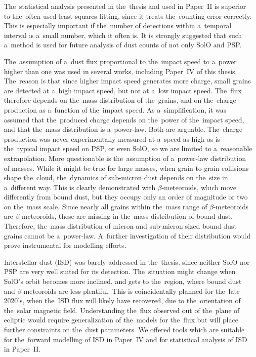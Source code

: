 The~statistical analysis presented in the~thesis and used in Paper~II is superior to the~often used least squares fitting, since it treats the~counting error correctly. This is especially important if the~number of detections within a~temporal interval is a~small number, which it often is. It is strongly suggested that such a~method is used for future analysis of dust counts of not only SolO and PSP. 

The~assumption of a~dust flux proportional to the~impact speed to a~power higher than one was used in several works, including Paper~IV of this thesis. The~reason is that since higher impact speed generates more charge, small grains are detected at a~high impact speed, but not at a~low impact speed. The~flux therefore depends on the~mass distribution of the~grains, and on the~charge production as a~function of the~impact speed. As a~simplification, it was assumed that the~produced charge depends on the~power of the~impact speed, and that the~mass distribution is a~power-law. Both are arguable. The~charge production was never experimentally measured at a~speed as high as is the~typical impact speed on PSP, or even SolO, so we are limited to a~reasonable extrapolation. More questionable is the~assumption of a~power-law distribution of masses. While it might be true for large masses, when grain to grain collisions shape the~cloud, the~dynamics of sub-micron dust depends on the~size in a~different way. This is clearly demonstrated with \mbox{$\beta$-meteoroids}, which move differently from bound dust, but they occupy only an order of magnitude or two on the~mass scale. Since nearly all grains within the~mass range of \mbox{$\beta$-meteoroids} are \mbox{$\beta$-meteoroids}, these are missing in the~mass distribution of bound dust. Therefore, the~mass distribution of micron and sub-micron sized bound dust grains cannot be a~power-law. A~further investigation of their distribution would prove instrumental for modelling efforts. 

Interstellar dust (ISD) was barely addressed in the~thesis, since neither SolO nor PSP are very well suited for its detection. The~situation might change when SolO's orbit becomes more inclined, and gets to the~region, where bound dust and \mbox{$\beta$-meteoroids} are less plentiful. This is coincidentally planned for the~late 2020's, when the~ISD flux will likely have recovered, due to the~orientation of the~solar magnetic field. Understanding the~flux observed out of the~plane of ecliptic would require generalization of the~models for the~flux but will place further constraints on the~dust parameters. We offered tools which are suitable for the~forward modelling of ISD in Paper~IV and for statistical analysis of ISD in Paper~II.


